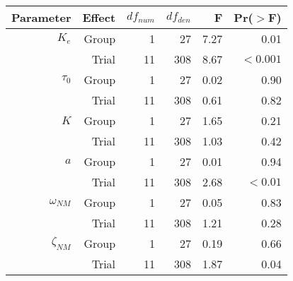 \begin{tabular}{*{6}{r}}
    \toprule
    Parameter & Effect & $df_{num}$ & $df_{den}$ & F & Pr($>$F) \\
    \midrule
    $K_e        $ &  Group &  1  &   27 & 7.27 &   0.01 \\
                &  Trial & 11  &  308 & 8.67 & $<0.001$ \\
    \midrule
    $\tau_0     $ &  Group &  1  &   27 & 0.02 & 0.90 \\
                &  Trial & 11  &  308 & 0.61 & 0.82 \\
    \midrule
    $K          $ &  Group &  1  &   27 & 1.65 & 0.21 \\
                &  Trial & 11  &  308 & 1.03 & 0.42 \\
    \midrule
    $a          $ &  Group &  1  &   27 & 0.01 & 0.94 \\
                &  Trial & 11  &  308 & 2.68 & $<0.01$ \\
    \midrule
    $\omega_{NM}$ &  Group &  1  &   27 & 0.05 & 0.83 \\
                &  Trial & 11  &  308 & 1.21 & 0.28 \\
    \midrule
    $\zeta_{NM} $ &  Group &  1  &   27 & 0.19 & 0.66 \\
                &  Trial & 11  &  308 & 1.87 & 0.04 \\
    \bottomrule
\end{tabular}







